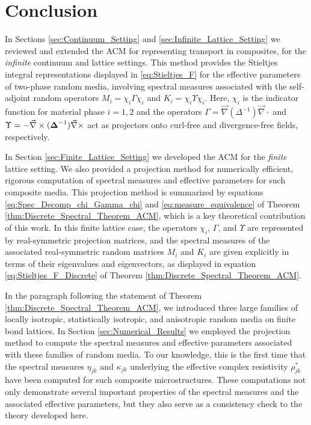 \documentclass{cmslatex}
\newcommand\bDelta{\mbox{\boldmath${\Delta}$}}
\begin{document}
\section{Conclusion}
%
In Sections \ref{sec:Continuum_Setting} and
\ref{sec:Infinite_Lattice_Setting} we reviewed and extended the ACM for
representing transport in composites, for the \emph{infinite}
continuum and lattice settings. This method provides the Stieltjes
integral representations displayed in \eqref{eq:Stieltjes_F} for the
effective parameters of two-phase random media, involving spectral
measures associated with the self-adjoint random operators
$M_i=\chi_i\Gamma\chi_i$ and $K_i=\chi_i\Upsilon\chi_i$. Here, $\chi_i$ is the indicator function
for material phase $i=1,2$ and the operators
$\Gamma=\vec{\nabla}(\Delta^{-1})\vec{\nabla}\cdot$ and $\Upsilon=-\vec{\nabla}\times(\bDelta^{-1})\vec{\nabla}\times$
act as projectors onto curl-free and divergence-free fields,
respectively. 






In Section \ref{sec:Finite_Lattice_Setting} we developed the ACM for
the \emph{finite} lattice setting. We also provided a projection
method for numerically efficient, rigorous computation of spectral
measures and effective parameters for such composite media. This
projection method is summarized by equations
\eqref{eq:Spec_Decomp_chi_Gamma_chi} and
\eqref{eq:measure_equivalence} of Theorem
\ref{thm:Discrete_Spectral_Theorem_ACM}, which is a key theoretical
contribution of this work. In this finite lattice case, the operators
$\chi_i$, $\Gamma$, and $\Upsilon$ are represented by real-symmetric projection
matrices, and the spectral measures of the associated real-symmetric
random matrices $M_i$ and $K_i$ are given explicitly in terms of their
eigenvalues and eigenvectors, as displayed in equation
\eqref{eq:Stieltjes_F_Discrete} of Theorem
\ref{thm:Discrete_Spectral_Theorem_ACM}. 



In the paragraph following the statement of Theorem
\ref{thm:Discrete_Spectral_Theorem_ACM}, we introduced three large
families of locally isotropic, statistically isotropic, and
anisotropic random media on finite bond lattices. In Section
\ref{sec:Numerical_Results} we employed the projection method to
compute the spectral measures and effective parameters associated with
these families of random media. To our knowledge, this is the first
time that the spectral measures $\eta_{jk}$ and $\kappa_{jk}$ underlying the
effective complex resistivity $\rho^*_{jk}$ have been computed for such
composite microstructures. These computations not only demonstrate
several important properties of the spectral measures and the
associated effective parameters, but they also serve as a consistency
check to the theory developed here.
\end{document}
